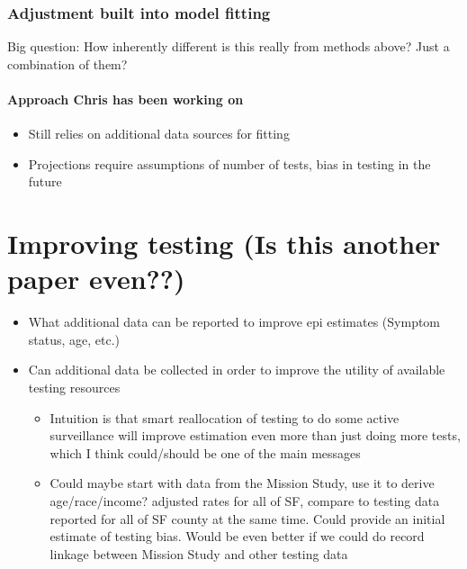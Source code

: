 \documentclass[
]{article}
\providecommand{\tightlist}{%
  \setlength{\itemsep}{0pt}\setlength{\parskip}{0pt}}
\begin{document}
\hypertarget{adjustment-built-into-model-fitting}{%
\subsubsection{Adjustment built into model
fitting}\label{adjustment-built-into-model-fitting}}

Big question: How inherently different is this really from methods
above? Just a combination of them?

\hypertarget{approach-chris-has-been-working-on}{%
\paragraph{Approach Chris has been working
on}\label{approach-chris-has-been-working-on}}

\begin{itemize}
\tightlist
\item
  Still relies on additional data sources for fitting\\
\item
  Projections require assumptions of number of tests, bias in testing in
  the future
\end{itemize}

\hypertarget{improving-testing-is-this-another-paper-even}{%
\section{Improving testing (Is this another paper
even??)}\label{improving-testing-is-this-another-paper-even}}

\begin{itemize}
\tightlist
\item
  What additional data can be reported to improve epi estimates (Symptom
  status, age, etc.)\\
\item
  Can additional data be collected in order to improve the utility of
  available testing resources

  \begin{itemize}
  \tightlist
  \item
    Intuition is that smart reallocation of testing to do some active
    surveillance will improve estimation even more than just doing more
    tests, which I think could/should be one of the main messages\\
  \item
    Could maybe start with data from the Mission Study, use it to derive
    age/race/income? adjusted rates for all of SF, compare to testing
    data reported for all of SF county at the same time. Could provide
    an initial estimate of testing bias. Would be even better if we
    could do record linkage between Mission Study and other testing data
  \end{itemize}
\end{itemize}
\end{document}
